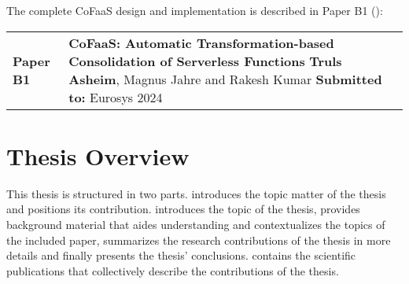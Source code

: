 \documentclass[../main.tex]{subfiles}
\begin{document}
\begin{refsection}
The complete CoFaaS design and implementation is described in Paper B1
():


\vspace*{0.5em}
\noindent
\begin{tabular}{lp{}}
\textbf{Paper B1} & \textbf{CoFaaS: Automatic Transformation-based
                    Consolidation of Serverless Functions} \newline
                     \textbf{Truls Asheim}, Magnus Jahre and Rakesh Kumar \newline
                     \textbf{Submitted to:} Eurosys 2024
\end{tabular}

\section{Thesis Overview}
This thesis is structured in two parts.  introduces the
topic matter of the thesis and positions its
contribution.  introduces the topic of the thesis,
 provides background material that aides
understanding and contextualizes the topics of the included paper,
 summarizes the research contributions of the
thesis in more details and finally  presents
the thesis' conclusions.  contains the scientific
publications that collectively describe the contributions of the
thesis.

\ifx\chapincluded\undefined
  \printbibliography
  \end{refsection}
 \fi
\end{document}

